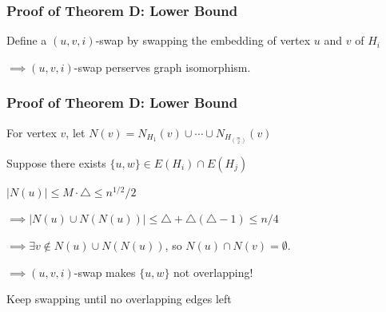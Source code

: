 \documentclass{beamer}
\begin{document}
\begin{frame}
  \frametitle{Proof of Theorem D: Lower Bound}

  Define a \alert{$(u, v, i)$-swap} by swapping the embedding of vertex $u$ and $v$ of $H_i$

  \pause

  \vspace{0.7cm} 
  
  $\implies (u, v, i)$-swap perserves graph isomorphism.
\end{frame}

\begin{frame}
  \frametitle{Proof of Theorem D: Lower Bound}

  For vertex $v$, let $N(v) = N_{H_1}(v) \cup \cdots \cup N_{H_{\binom{m}{2}}}(v)$

  \pause

  \vspace{0.5cm} 

  Suppose there exists $\{u, w\} \in E(H_i) \cap E(H_j)$

  \pause

  \vspace{0.5cm} 

  $|N(u)| \leq M \cdot \triangle \leq n^{1/2}/2$

  \pause

  \vspace{0.5cm} 

  $\implies |N(u) \cup N(N(u))| \leq \triangle + \triangle(\triangle - 1) \leq n/4$

  \pause

  \vspace{0.5cm} 

  $\implies \exists v \notin N(u) \cup N(N(u))$, so $N(u) \cap N(v) = \emptyset$.

  \pause

  \vspace{0.5cm} 

  $\implies (u, v, i)$-swap makes $\{u, w\}$ not overlapping!

  \pause

  \vspace{0.5cm} 

  Keep swapping until no overlapping edges left

\end{frame}
\end{document}
